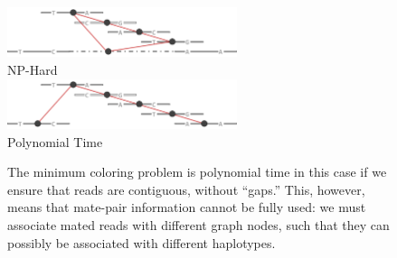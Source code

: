 \documentclass[11pt]{llncs}
\begin{document}
\begin{figure}[!h]
\centering
   \includegraphics[width=0.6\textwidth]{graphics/mate-pair}\\
   NP-Hard\\
   \vspace{1em}
   \includegraphics[width=0.6\textwidth]{graphics/mate-pair_broken}\\
   Polynomial Time
   \caption{The minimum coloring problem is polynomial time in this case if we ensure that reads are contiguous, without ``gaps.'' This, however, 
   means that mate-pair information cannot be fully used: we must associate mated reads with different graph nodes, such that they can possibly
   be associated with different haplotypes.}
   \label{matePairs}
\end{figure}



\end{document}

